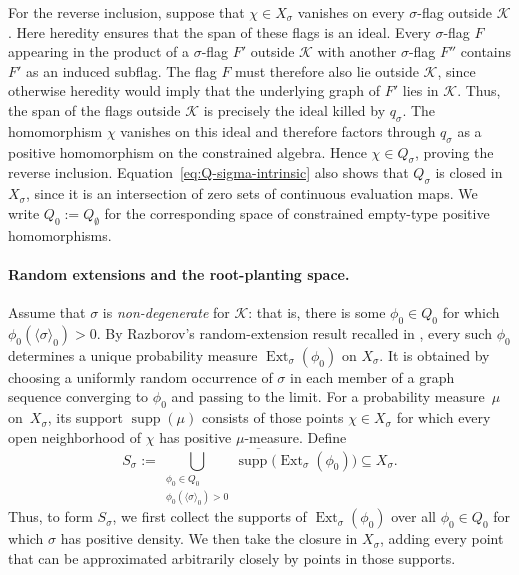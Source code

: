 \documentclass{article}
\newcommand{\Ext}{\operatorname{Ext}}
\begin{document}
For the reverse inclusion, suppose that \(\chi\in X_\sigma\) vanishes on
every \(\sigma\)-flag outside \(\mathcal K\).  Here heredity ensures that the
span of these flags is an ideal.  Every \(\sigma\)-flag \(F\) appearing in
the product of a \(\sigma\)-flag \(F'\) outside \(\mathcal K\) with another
\(\sigma\)-flag \(F''\) contains \(F'\) as an induced subflag.  The flag \(F\)
must therefore also lie outside \(\mathcal K\), since otherwise heredity would
imply that the underlying graph of \(F'\) lies in \(\mathcal K\).  Thus, the
span of the flags outside \(\mathcal K\) is precisely the ideal killed by
\(q_\sigma\).  The homomorphism \(\chi\) vanishes on this ideal and therefore
factors through \(q_\sigma\) as a positive homomorphism on the constrained
algebra.  Hence \(\chi\in Q_\sigma\), proving the reverse inclusion.
Equation~\eqref{eq:Q-sigma-intrinsic} also shows
that \(Q_\sigma\) is closed in \(X_\sigma\), since it is an intersection of
zero sets of continuous evaluation maps.  We write
\(Q_0:=Q_{\emptyset}\) for the corresponding space of constrained empty-type
positive homomorphisms.

\paragraph{Random extensions and the root-planting space.}
Assume that \(\sigma\) is \emph{non-degenerate} for \(\mathcal K\): that is,
there is some \(\phi_0\in Q_0\) for which
\(\phi_0(\langle\sigma\rangle_0)>0\).  By Razborov's random-extension result
recalled in , every such \(\phi_0\) determines a
unique probability measure \(\Ext_\sigma(\phi_0)\) on \(X_\sigma\).  It is
obtained by choosing a uniformly random occurrence of \(\sigma\) in each
member of a graph sequence converging to \(\phi_0\) and passing to the
limit.  For a probability
measure~\(\mu\) on~\(X_\sigma\), its
support \(\operatorname{supp}(\mu)\) consists of those points
\(\chi\in X_\sigma\) for which every open neighborhood of \(\chi\) has positive
\(\mu\)-measure.
Define
\begin{equation}\label{eq:S-sigma}
  S_\sigma
  :=
  \overline{
    \bigcup_{\substack{\phi_0\in Q_0\\
                        \phi_0(\langle\sigma\rangle_0)>0}}
    \operatorname{supp}\bigl(\Ext_\sigma(\phi_0)\bigr)
  }
  \subseteq X_\sigma.
\end{equation}
Thus, to form \(S_\sigma\), we first collect the supports of
\(\Ext_\sigma(\phi_0)\) over all \(\phi_0\in Q_0\) for which \(\sigma\) has
positive density.  We then take the closure in \(X_\sigma\), adding every point
that can be approximated arbitrarily closely by points in those supports.
\end{document}
